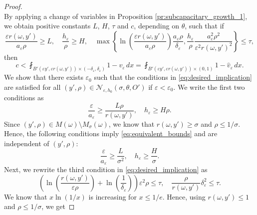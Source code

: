 \documentclass{article}
\numberwithin{equation}{section}
\theoremstyle{definition}
\theoremstyle{remark}
\begin{document}
\begin{proof}
\[    \]
    By applying a change of variables in Proposition \ref{pr:subcapacitary_growth_1}, we obtain positive constants $L$, $H$, $\tau$ and $c$, depending on $\theta$, such that if
    \begin{equation} \label{eq:desired_implication}
         \frac{\varepsilon r(\omega, y')}{a_\varepsilon \rho} \ge L, \quad \frac{h_\varepsilon}{\rho} \ge H, \quad \max \left\{\ln\left(\frac{\varepsilon r(\omega, y')}{a_\varepsilon \rho}\right) \frac{a_\varepsilon \rho}{\delta_\varepsilon}, \frac{h_\varepsilon}{\rho}\frac{a_\varepsilon^2 \rho^2}{\varepsilon^2 r(\omega, y')^2}\right\} \le \tau,
    \end{equation}
    then
    \begin{equation}
        c < \fint_{B'(\varepsilon y', \varepsilon r(\omega, y')) \times (-\delta_\varepsilon, \delta_\varepsilon)} 1 - v_\varepsilon \, dx = \fint_{B'(\varepsilon y', \varepsilon r(\omega, y')) \times (0, 1)} 1 - \hat{v}_\varepsilon \, dx.
    \end{equation}
    We show that there exists $\varepsilon_0$ such that the conditions in \eqref{eq:desired_implication} are satisfied for all $(y', \rho) \in \mathcal{N}_{\varepsilon, h_0}(\sigma, \theta, O')$ if $\varepsilon < \varepsilon_0$. We write the first two conditions as
    \begin{equation} \label{eq:equivalent_bounds}
        \frac{\varepsilon}{a_\varepsilon} \ge \frac{L \rho}{r(\omega, y')}, \quad h_\varepsilon \ge H \rho.
    \end{equation}
    Since $(y', \rho) \in M(\omega) \setminus M_\sigma(\omega)$, we know that $r(\omega, y') \ge \sigma$ and $\rho \le 1/\sigma$. Hence, the following conditions imply \eqref{eq:equivalent_bounds} and are independent of $(y', \rho)$:
    \begin{equation} \label{eq:equivalent_bounds_independent}
        \frac{\varepsilon}{a_\varepsilon} \ge \frac{L}{\sigma^2}, \quad h_\varepsilon \ge \frac{H}{\sigma}.
    \end{equation}
    Next, we rewrite the third condition in \eqref{eq:desired_implication} as
    \begin{equation} \label{eq:equivalent_bounds_2}
        \left(\ln\left(\frac{r(\omega, y')}{\varepsilon \rho}\right) + \ln\left(\frac{1}{\delta_\varepsilon}\right) \right) \varepsilon^2 \rho \le \tau, \quad \frac{\rho}{r(\omega, y')} \delta_\varepsilon^2 \le \tau.
    \end{equation}
    We know that $x \ln(1/x)$ is increasing for $x \le 1/e$. Hence, using $r(\omega, y') \le 1$ and $\rho \le 1/\sigma$, we get

\end{proof}
\end{document}
